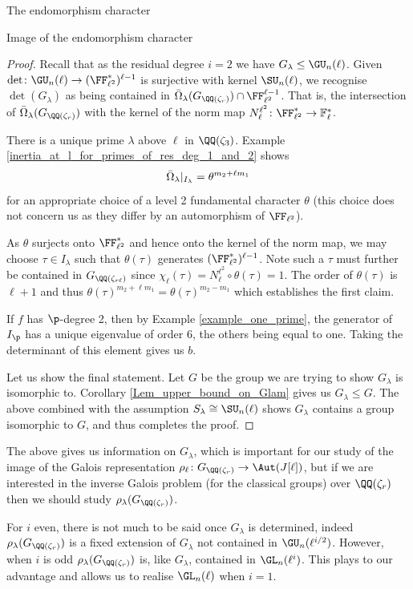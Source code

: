 \documentclass[11pt,a4paper]{article}
\newcommand{\Fl}{\mathbb{F}_\ell}
\newcommand{\Qr}{{\QQ(\zeta_r)}}
\newcommand{\GQr}{G_{\QQ(\zeta_{r})}}
\newcommand{\GQrl}{G_{\QQ(\zeta_{r\ell})}}
\newcommand{\Glam}{G_{\lambda}}
\newcommand{\Slam}{S_{\lambda}}
\begin{document}
\begin{section}{The endomorphism character}
\begin{subsection}{Image of the endomorphism character}
\begin{proof}
Recall that as the residual degree $i=2$ we have $\Glam \leq \GU_{n}(\ell)$.
Given $\det \colon \GU_{n}(\ell) \rightarrow (\FF_{\ell^2}^*)^{\ell-1}$ is surjective with kernel $\SU_n(\ell)$, we recognise $\det(\Glam)$ as being contained in $\Bar{\Omega}_\lambda(\GQr)\cap \FF_{\ell^2}^{\ell-1}$.
That is, the intersection of $\Bar{\Omega}_\lambda(\GQr)$ with the kernel of the norm map $N^{\ell^2}_\ell\colon \FF_{\ell^2}^* \rightarrow \Fl^*$.  

There is a unique prime $\lambda$ above $\ell$ in $\QQ(\zeta_3)$. Example \ref{inertia_at_l_for_primes_of_res_deg_1_and_2} shows
\[
\Bar{\Omega}_\lambda|_{I_{\lambda}} = \theta^{m_{2} + \ell m_1 }
\]
for an appropriate choice of a level 2 fundamental character $\theta$ (this choice does not concern us as they differ by an automorphism of $\FF_{\ell^2}$).

 As $\theta$ surjects onto $\FF_{\ell^2}^*$  and hence onto the kernel of the norm map, we may choose $\tau \in I_\lambda$ such that $\theta(\tau)$ generates $(\FF_{\ell^2}^*)^{\ell-1}$. Note such a $\tau$ must further be contained in $\GQrl$ since $\chi_\ell(\tau) = N^{\ell^2}_{\ell} \circ \theta(\tau) =1$.  
 The order of $\theta(\tau)$ is $\ell+1$ and thus $\theta(\tau)^{m_{2} + \ell m_1} = \theta(\tau)^{m_{2} - m_1} $ which establishes the first claim.
 
If $f$ has $\p$-degree 2, then by Example \ref{example_one_prime}, the generator of $I_\p$ has a unique eigenvalue of order $6$, the others being equal to one. Taking the determinant of this element gives us $b$. 

Let us show the final statement. Let $G$ be the group we are trying to show $\Glam$ is isomorphic to. Corollary \ref{Lem_upper_bound_on_Glam} gives us $\Glam \leq G$. The above combined with the assumption $\Slam \cong \SU_n(\ell)$ shows $\Glam$ contains a group isomorphic to $G$, and thus completes the proof.
\end{proof}

The above gives us information on $\Glam$, which is important for our study of the image of the Galois representation $\rho_\ell\colon \GQr \rightarrow \Aut(J[\ell])$, but if we are interested in the inverse Galois problem (for the classical groups) over $\Qr$ then we should study $\rho_\lambda(\GQr)$.

For $i$ even, there is not much to be said once $\Glam$ is determined, indeed $\rho_\lambda(\GQr)$ is a fixed extension of $\Glam$ not contained in $\GU_n(\ell^{i/2})$.
However, when $i$ is odd $\rho_\lambda(\GQr) $ is, like $\Glam$, contained in $\GL_n(\ell^i)$. 
This plays to our advantage and allows us to realise $\GL_n(\ell)$ when $i=1$. 


\end{subsection}
\end{section}
\end{document}
